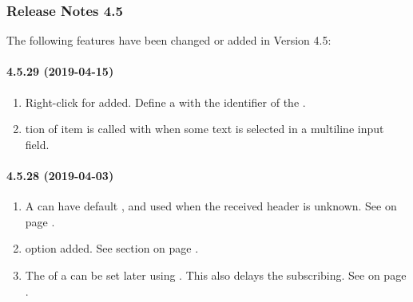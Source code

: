 \subsubsection{Release Notes 4.5}
\label{sec:releasenotes-4-5}
The following features have been changed or added in Version 4.5:\\

\paragraph{4.5.29 (2019-04-15)}
\begin{enumerate}
\item Right-click \MENU{} for \THERMO{} added. Define a \MENU{} with the identifier of the \THERMO{}.
\item \FUNC{} tion of item is called with \REASONSELECT{} when some text is selected in a multiline \STRING{} input field.
\end{enumerate}
\paragraph{4.5.28 (2019-04-03)}
\begin{enumerate}
\item A \REPLY{} \MESSAGEQUEUE{} can have default \FUNC, \REQUEST{} and \RESPONSE{} used when the received header
      is unknown. See  on page \pageref{dia:opmessagequeueoption}.
\item \TIMER{} option \MAXPENDINGFUNCTIONS{} added.
      See section  on page \pageref{sec:optimer}.
\item The \HOST{} of a \SUBSCRIBE{} \MESSAGEQUEUE{} can be set later using \SETMQHOST.
      This also delays the subscribing.
      See  on page \pageref{dia:messagequeueaction}.
\end{enumerate}
